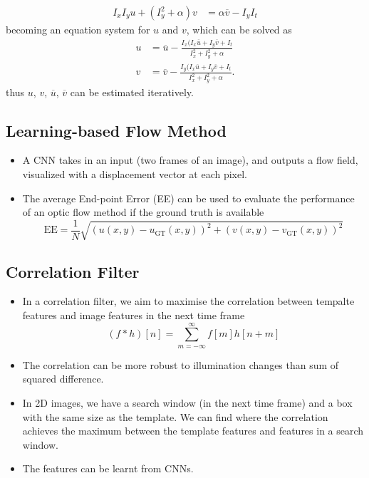 \documentclass[twocolumn,landscape,10pt]{article}
\theoremstyle{definition}
\begin{document}
\begin{itemize}
\begin{align*}
            I_xI_yu+(I_y^2+\alpha)v & = \alpha \overline{v}-I_yI_t
        \end{align*} 
        becoming an equation system for $u$ and $v$, which can be solved as
        \begin{align*}
            u & = \overline{u}-\frac{I_x(I_x \overline{u}+I_y \overline{v}+I_t}
            {I_x^2+I_y^2+\alpha} \\
            v & = \overline{v}-\frac{I_y(I_x \overline{u}+I_y \overline{v}+I_t}
            {I_x^2+I_y^2+\alpha}.
        \end{align*} 
        thus $u$, $v$, $\overline{u}$, $\overline{v}$ can be estimated iteratively.
\end{itemize} 

\subsection{Learning-based Flow Method}

\begin{itemize}
    \item A CNN takes in an input (two frames of an image), and outputs a flow
        field, visualized with a displacement vector at each pixel.
    \item The average End-point Error (EE) can be used to evaluate the
        performance of an optic flow method if the ground truth is available
        \[
            \text{EE}=\frac{1}{N}\sqrt{{(u(x,y)-u_\text{GT}(x,y))}^{2}+{(v(x,y)-v_\text{GT}(x,y))}^{2}}
        \]
\end{itemize} 


\subsection{Correlation Filter}

\begin{itemize}
    \item In a correlation filter,
        we aim to maximise the correlation between tempalte
        features and image features in the next time frame
        \[
            (f*h)[n]=\sum_{m=-\infty}^{\infty}f[m]h[n+m]
        \]
    \item The correlation can be more robust to illumination changes 
        than sum of squared difference.
    \item In 2D images, we have a search window (in the next time frame) and a
        box with the same size as the template. We can find where the
        correlation achieves the maximum between the template features and
        features in a search window.
    \item The features can be learnt from CNNs.
\end{itemize} 
\end{document}
